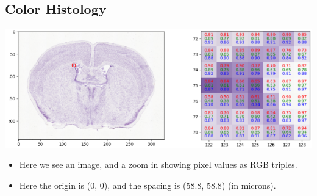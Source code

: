 \documentclass[10pt]{article}
\begin{document}
\subsection*{Color Histology}
\begin{center}
    \includegraphics[scale=1]{W1_5.png}
\end{center}
\begin{itemize}
    \item Here we see an image, and a zoom in showing pixel values as RGB triples.
    \item Here the origin is (0, 0), and the spacing is (58.8, 58.8) (in microns).
\end{itemize}
\end{document}

